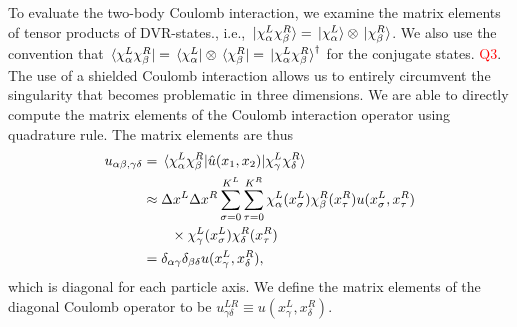 \documentclass[twocolumn,superscriptaddress,unsortedaddress,
 amsmath,amssymb,
 aps,
]{revtex4-2}
\begin{document}
        To evaluate the two-body Coulomb interaction, we examine the matrix elements of tensor products of DVR-states., i.e., $\ket*{\chi^L_{\alpha} \chi^R_{\beta}} = \ket*{\chi^L_{\alpha}} \otimes
        \ket*{\chi^R_{\beta}}$.
        We also use the convention that $\bra*{\chi^L_{\alpha} \chi^R_{\beta}} = \bra*{\chi^L_{\alpha}} \otimes \bra*{\chi^R_{\beta}} = \ket*{\chi^L_{\alpha} \chi^R_{\beta}}^{\dagger}$ for the conjugate states.
        \textcolor{red}{Q3}. The use of a shielded Coulomb interaction allows us to entirely circumvent the singularity that becomes problematic in three dimensions.
        We are able to directly compute the matrix elements of the Coulomb interaction operator using quadrature rule.
        The matrix elements are thus
        \begin{align*}
            u_{\alpha \beta, \gamma \delta}
            &= \mel*{\chi^{L}_{\alpha} \chi^{R}_{\beta}}{
                \hat{u}(x_1, x_2)
            }{\chi^L_{\gamma} \chi^R_{\delta}}
            \\
            &\approx \Delta x^L \Delta x^R
            \sum_{\sigma = 0}^{K^L} \sum_{\tau = 0}^{K^R}
            \chi^L_{\alpha}(x^L_{\sigma})
            \chi^R_{\beta}(x^R_{\tau})
            u(x^L_{\sigma}, x^R_{\tau})
            \nonumber
            \\
            &\qquad\times
            \chi^L_{\gamma}(x^L_{\sigma})
            \chi^R_{\delta}(x^R_{\tau})
            \\
            &= \delta_{\alpha \gamma} \delta_{\beta \delta}
            u(x^L_{\gamma}, x^R_{\delta}),
        \end{align*}
        which is diagonal for each particle axis.
        We define the matrix elements of the diagonal Coulomb operator to be $u^{LR}_{\gamma \delta} \equiv u(x^L_{\gamma}, x^R_{\delta})$.



\end{document}
